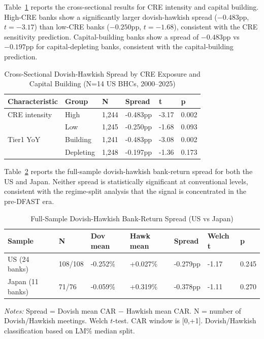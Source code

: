 \documentclass[12pt,a4paper]{article}
\begin{document}
Table~\ref{tab:cross_section} reports the cross-sectional results for CRE intensity and capital building. High-CRE banks show a significantly larger dovish-hawkish spread ($-0.483$pp, $t = -3.17$) than low-CRE banks ($-0.250$pp, $t = -1.68$), consistent with the CRE sensitivity prediction. Capital-building banks show a spread of $-0.483$pp vs $-0.197$pp for capital-depleting banks, consistent with the capital-building prediction.

\begin{table}[H]
\centering
\caption{Cross-Sectional Dovish-Hawkish Spread by CRE Exposure and Capital Building (N=14 US BHCs, 2000–2025)}
\label{tab:cross_section}
\small
\begin{tabular}{llllll}
\toprule
Characteristic & Group & N & Spread & t & p \\
\midrule
CRE intensity & High & 1,244 & -0.483pp & -3.17 & 0.002 \\
 & Low & 1,245 & -0.250pp & -1.68 & 0.093 \\
Tier1 YoY & Building & 1,241 & -0.483pp & -3.08 & 0.002 \\
 & Depleting & 1,248 & -0.197pp & -1.36 & 0.173 \\
\bottomrule
\end{tabular}
\end{table}

Table~\ref{tab:full_sample} reports the full-sample dovish-hawkish bank-return spread for both the US and Japan. Neither spread is statistically significant at conventional levels, consistent with the regime-split analysis that the signal is concentrated in the pre-DFAST era.

\begin{table}[H]
\centering
\caption{Full-Sample Dovish-Hawkish Bank-Return Spread (US vs Japan)}
\label{tab:full_sample}
\small
\begin{tabular}{lllllll}
\toprule
Sample & N & Dov mean & Hawk mean & Spread & Welch t & p \\
\midrule
US (24 banks) & 108/108 & -0.252\% & +0.027\% & -0.279pp & -1.17 & 0.245 \\
Japan (11 banks) & 71/76 & -0.059\% & +0.319\% & -0.378pp & -1.11 & 0.270 \\
\bottomrule
\end{tabular}
\end{table}
\noindent\textit{Notes:} Spread = Dovish mean CAR $-$ Hawkish mean CAR. N = number of Dovish/Hawkish meetings. Welch $t$-test. CAR window is [0,+1]. Dovish/Hawkish classification based on LM\% median split.
\end{document}
